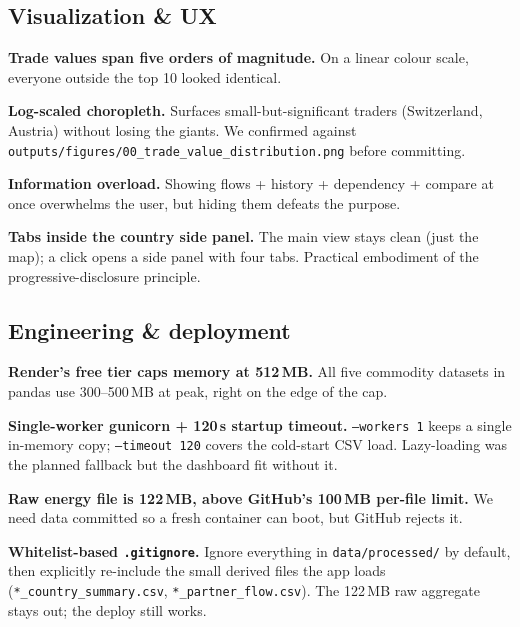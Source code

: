 \documentclass[a4paper,10pt]{article}
\begin{document}
\subsection{Visualization \& UX}

\begin{challenge}
\textbf{Trade values span five orders of magnitude.}
On a linear colour scale, everyone outside the top 10 looked identical.
\end{challenge}
\begin{decision}
\textbf{Log-scaled choropleth.}
Surfaces small-but-significant traders (Switzerland, Austria) without
losing the giants. We confirmed against
\texttt{outputs/figures/00\_trade\_value\_distribution.png} before committing.
\end{decision}

\begin{challenge}
\textbf{Information overload.}
Showing flows + history + dependency + compare at once overwhelms the user,
but hiding them defeats the purpose.
\end{challenge}
\begin{decision}
\textbf{Tabs inside the country side panel.}
The main view stays clean (just the map); a click opens a side panel with four
tabs. Practical embodiment of the progressive-disclosure principle.
\end{decision}

\subsection{Engineering \& deployment}

\begin{challenge}
\textbf{Render's free tier caps memory at 512\,MB.}
All five commodity datasets in pandas use 300--500\,MB at peak, right on
the edge of the cap.
\end{challenge}
\begin{decision}
\textbf{Single-worker gunicorn + 120\,s startup timeout.}
\texttt{--workers 1} keeps a single in-memory copy; \texttt{--timeout 120}
covers the cold-start CSV load. Lazy-loading was the planned fallback but the
dashboard fit without it.
\end{decision}

\begin{challenge}
\textbf{Raw energy file is 122\,MB, above GitHub's 100\,MB per-file limit.}
We need data committed so a fresh container can boot, but GitHub rejects it.
\end{challenge}
\begin{decision}
\textbf{Whitelist-based \texttt{.gitignore}.}
Ignore everything in \texttt{data/processed/} by default, then explicitly
re-include the small derived files the app loads
(\texttt{*\_country\_summary.csv}, \texttt{*\_partner\_flow.csv}). The 122\,MB
raw aggregate stays out; the deploy still works.
\end{decision}
\end{document}
